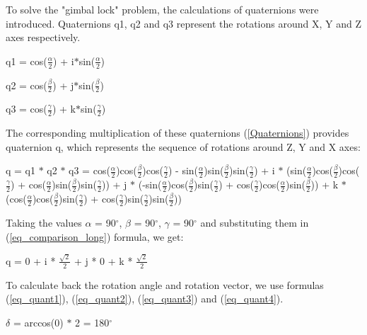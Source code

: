 \documentclass[times, 10pt,twocolumn]{article}
\begin{document}
To solve the "gimbal lock" problem, the calculations of quaternions were introduced. Quaternions q1, q2 and q3 represent the rotations around X, Y and Z axes respectively.

\begin{description}
    \setlength{\itemsep}{0pt}

    \item q1 = cos($\frac{\alpha}{2}$) + i$\ast$sin($\frac{\alpha}{2}$)
    \item q2 = cos($\frac{\beta}{2}$) + j$\ast$sin($\frac{\beta}{2}$)
    \item q3 = cos($\frac{\gamma}{2}$) + k$\ast$sin($\frac{\gamma}{2}$)
\end{description}

The corresponding multiplication of these quaternions (\ref{Quaternions}) provides quaternion q, which represents the sequence of rotations around Z, Y and X axes:

\begin{description}
    \setlength{\itemsep}{0pt}

    \item q = q1 $\ast$ q2 $\ast$ q3 = cos($\frac{\alpha}{2}$)cos($\frac{\beta}{2}$)cos($\frac{\gamma}{2}$) - sin($\frac{\alpha}{2}$)sin($\frac{\beta}{2}$)sin($\frac{\gamma}{2}$) + i $\ast$ (sin($\frac{\alpha}{2}$)cos($\frac{\beta}{2}$)cos($\frac{\gamma}{2}$) + cos($\frac{\alpha}{2}$)sin($\frac{\beta}{2}$)sin($\frac{\gamma}{2}$)) + j $\ast$ (-sin($\frac{\alpha}{2}$)cos($\frac{\beta}{2}$)sin($\frac{\gamma}{2}$) + cos($\frac{\gamma}{2}$)cos($\frac{\alpha}{2}$)sin($\frac{\beta}{2}$)) + k $\ast$ (cos($\frac{\alpha}{2}$)cos($\frac{\beta}{2}$)sin($\frac{\gamma}{2}$) + cos($\frac{\gamma}{2}$)sin($\frac{\gamma}{2}$)sin($\frac{\beta}{2}$))
        \begin{equation}
        \label{eq_comparison_long}
        \end{equation}
\end{description}

Taking the values $\alpha$ = 90$^{\circ}$, $\beta$ = 90$^{\circ}$, $\gamma$ = 90$^{\circ}$ and substituting them in (\ref{eq_comparison_long}) formula, we get:

q = 0 + i * $\frac{\sqrt{2}}{2}$ + j * 0 + k * $\frac{\sqrt{2}}{2}$

To calculate back the rotation angle and rotation vector, we use formulas (\ref{eq_quant1}), (\ref{eq_quant2}), (\ref{eq_quant3}) and (\ref{eq_quant4}).

$\delta$ = arccos(0) $\ast$ 2 = 180$^{\circ}$
\end{document}
